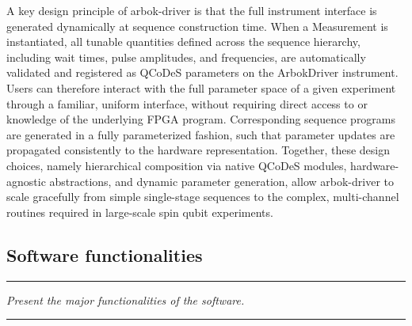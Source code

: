 \documentclass[numbers, preprint, twocolumn,10pt]{elsarticle}
\newenvironment{instructions}
  {\hrule\vspace{4pt}\begingroup\color{red}\itshape}
  {\endgroup\hrule\vspace{4pt}}
\begin{document}
A key design principle of arbok-driver is that the full instrument interface is generated dynamically at sequence construction time.
When a Measurement is instantiated, all tunable quantities defined across the sequence hierarchy, including wait times, pulse amplitudes, and frequencies, are automatically validated and registered as QCoDeS parameters on the ArbokDriver instrument.
Users can therefore interact with the full parameter space of a given experiment through a familiar, uniform interface, without requiring direct access to or knowledge of the underlying FPGA program.
Corresponding sequence programs are generated in a fully parameterized fashion, such that parameter updates are propagated consistently to the hardware representation.
Together, these design choices, namely hierarchical composition via native QCoDeS modules, hardware-agnostic abstractions, and dynamic parameter generation, allow arbok-driver to scale gracefully from simple single-stage sequences to the complex, multi-channel routines required in large-scale spin qubit experiments.

\subsection{Software functionalities}

\label{sec:functionalities}
\begin{instructions}
    \textit{ Present the major functionalities of the software.}
\end{instructions}
\end{document}
